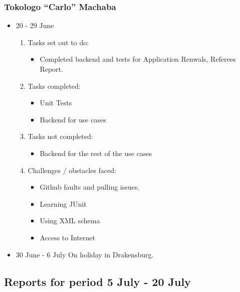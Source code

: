 \documentclass[12pt]{article}
\begin{document}
\subsubsection{Tokologo “Carlo” Machaba}
\begin{itemize}
	\item 20 - 29 June
	\begin{enumerate}
	\item Tasks set out to do:
	\begin{itemize}
		\item Completed backend and tests for Application Renwals, Referees Report.
	\end{itemize}
	\item Tasks completed:
	\begin{itemize}
		\item Unit Tests
		\item Backend for use cases
	\end{itemize}
	\item Tasks not completed:
	\begin{itemize}
		\item Backend for the rest of the use cases
	\end{itemize}	
	\item Challenges / obstacles faced:
	\begin{itemize}
		\item Github faults and pulling issues.
		\item Learning JUnit 
		\item Using XML schema
		\item Access to Internet
	\end{itemize}
	\end{enumerate}
	\item 30 June - 6 July On holiday in Drakensburg.	 
\end{itemize}



\subsection{Reports for period 5 July - 20 July}
\end{document}
